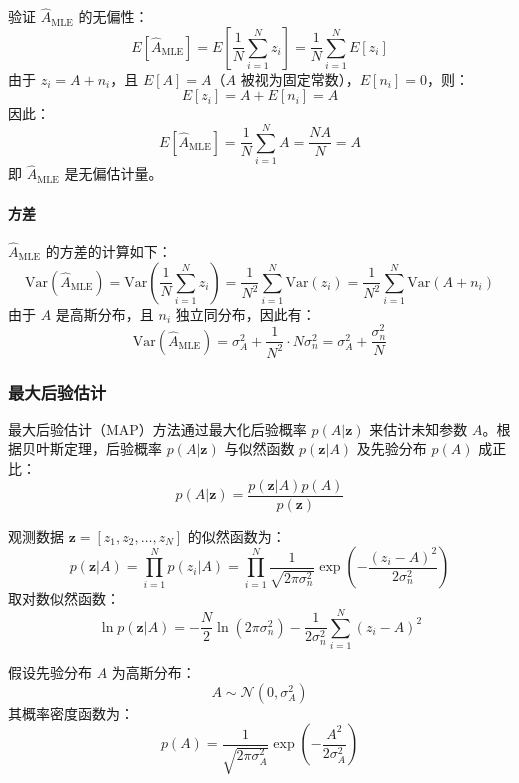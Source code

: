 \documentclass[12pt]{ctexart}
\begin{document}
验证 \( \hat{A}_{\text{MLE}} \) 的无偏性：
\[
E[\hat{A}_{\text{MLE}}] = E\left[ \frac{1}{N} \sum_{i=1}^{N} z_i \right] = \frac{1}{N} \sum_{i=1}^{N} E[z_i]
\]
由于 \( z_i = A + n_i \)，且 \( E[A] = A \)（\( A \) 被视为固定常数），\( E[n_i] = 0 \)，则：
\[
E[z_i] = A + E[n_i] = A
\]
因此：
\[
E[\hat{A}_{\text{MLE}}] = \frac{1}{N} \sum_{i=1}^{N} A = \frac{N A}{N} = A
\]
即 \( \hat{A}_{\text{MLE}} \) 是无偏估计量。

\paragraph{方差}

\( \hat{A}_{\text{MLE}} \) 的方差的计算如下：
\[
\text{Var}(\hat{A}_{\text{MLE}}) = \text{Var}\left( \frac{1}{N} \sum_{i=1}^{N} z_i \right) = \frac{1}{N^2} \sum_{i=1}^{N} \text{Var}(z_i) = \frac{1}{N^2} \sum_{i=1}^{N} \text{Var}(A + n_i)
\]
由于 \( A \) 是高斯分布，且 \( n_i \) 独立同分布，因此有：
\[
\text{Var}(\hat{A}_{\text{MLE}}) = \sigma_A^2 + \frac{1}{N^2} \cdot N \sigma_n^2 =\sigma_A^2 + \frac{\sigma_n^2}{N}
\]

\subsubsection*{最大后验估计}

最大后验估计（MAP）方法通过最大化后验概率 \( p(A | \mathbf{z}) \) 来估计未知参数 \( A \)。根据贝叶斯定理，后验概率 \( p(A | \mathbf{z}) \) 与似然函数 \( p(\mathbf{z} | A) \) 及先验分布 \( p(A) \) 成正比：
\[
p(A | \mathbf{z}) = \frac{p(\mathbf{z} | A) p(A)}{p(\mathbf{z})}
\]

观测数据 \( \mathbf{z} = [z_1, z_2, \ldots, z_N] \) 的似然函数为：
\[
p(\mathbf{z} | A) = \prod_{i=1}^{N} p(z_i | A) = \prod_{i=1}^{N} \frac{1}{\sqrt{2\pi\sigma_n^2}} \exp\left( -\frac{(z_i - A)^2}{2\sigma_n^2} \right)
\]
取对数似然函数：
\[
\ln p(\mathbf{z} | A) = -\frac{N}{2} \ln(2\pi\sigma_n^2) - \frac{1}{2\sigma_n^2} \sum_{i=1}^{N} (z_i - A)^2
\]

假设先验分布 \( A \) 为高斯分布：
\[
A \sim \mathcal{N}(0, \sigma_A^2)
\]
其概率密度函数为：
\[
p(A) = \frac{1}{\sqrt{2\pi\sigma_A^2}} \exp\left( -\frac{A^2}{2\sigma_A^2} \right)
\]
\end{document}
